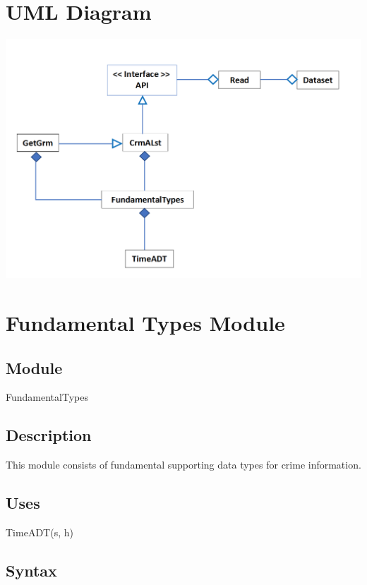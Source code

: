 \documentclass[12pt]{article}
\begin{document}
\section* {UML Diagram}

\begin{center}
\includegraphics[scale = 0.65]{UML.png}
\end{center}
 
\newpage



\section* {Fundamental Types Module}

\subsection*{Module}

FundamentalTypes

\subsection* {Description}
This module consists of fundamental supporting data types for crime information.

\subsection* {Uses}

TimeADT(s, h)

\subsection* {Syntax}
\end{document}
